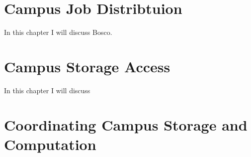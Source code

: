\documentclass[print]{nuthesis}
\begin{document}


\chapter{Campus Job Distribtuion}

In this chapter I will discuss Bosco.

\chapter{Campus Storage Access}
In this chapter I will discuss


\chapter{Coordinating Campus Storage and Computation}



\backmatter

\appendix






\end{document}
